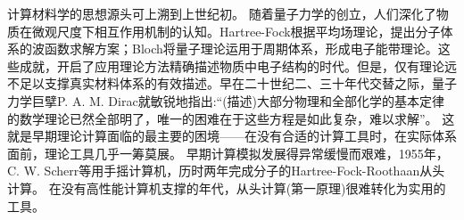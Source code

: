 
计算材料学的思想源头可上溯到上世纪初。
随着量子力学的创立，人们深化了物质在微观尺度下相互作用机制的认知。\textrm{Hartree-Fock}根据平均场理论，提出分子体系的波函数求解方案；\textrm{Bloch}将量子理论运用于周期体系，形成电子能带理论。这些成就，开启了应用理论方法精确描述物质中电子结构的时代。但是，仅有理论远不足以支撑真实材料体系的有效描述。早在二十世纪二、三十年代交替之际，量子力学巨擘\textrm{P. A. M. Dirac}就敏锐地指出:``(描述)大部分物理和全部化学的基本定律的数学理论已然全部明了，唯一的困难在于这些方程是如此复杂，难以求解''。
这就是早期理论计算面临的最主要的困境——在没有合适的计算工具时，在实际体系面前，理论工具几乎一筹莫展。
早期计算模拟发展得异常缓慢而艰难，\textrm{1955}年， \textrm{C. W. Scherr}等用手摇计算机，历时两年完成分子的\textrm{Hartree-Fock-Roothaan}从头计算。%
在没有高性能计算机支撑的年代，从头计算(第一原理)很难转化为实用的工具。







